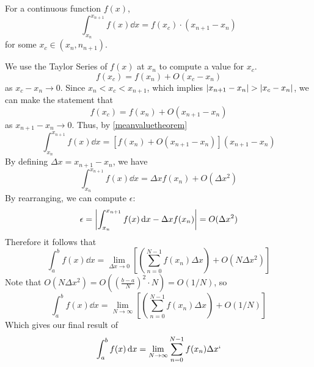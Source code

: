 \documentclass{article}
\begin{document}
\begin{theorem}
	For a continuous function $f(x)$,
	\begin{equation}\label{meanvaluetheorem}
		\int_{x_n}^{x_{n+1}} f(x) \dd{x} = f(x_c) \cdot (x_{n+1} - x_n)
	\end{equation}
	for some $x_c\in (x_n, n_{n+1})$.
\end{theorem}
\noindent We use the Taylor Series of $f(x)$ at $x_n$ to compute a value for $x_c$.
\[ f(x_c) = f(x_n) + O(x_c - x_n) \]
as $x_c - x_n \to 0$. Since $x_n < x_c < x_{n+1}$, which implies $\abs{x_{n+1} - x_n} > \abs{x_c - x_n}$, we can make the statement that
\[ f(x_c) = f(x_n) + O(x_{n+1} - x_n) \]
as $x_{n+1} - x_n \to 0$. Thus, by \eqref{meanvaluetheorem}
\[ \int_{x_n}^{x_{n+1}} f(x) \dd{x} = \left[ f(x_n) + O(x_{n+1} - x_n) \right] (x_{n+1} - x_n) \]
By defining $\Delta x = x_{n+1} - x_n$, we have
\begin{equation}
	\int_{x_n}^{x_{n+1}} f(x) \dd{x} = \Delta x f(x_n) + O(\Delta x ^ 2)
\end{equation}
By rearranging, we can compute $\epsilon$:
\[ \epsilon = \abs{\int_{x_n}^{x_{n+1}} f(x) \dd{x} - \Delta x f(x_n)} = O(\Delta x ^ 2) \]
Therefore it follows that
\[ \int_{a}^{b} f(x) \dd{x} = \lim_{\Delta x \to 0} \left[ \left( \sum_{n=0}^{N-1} f(x_n) \Delta x \right) + O(N\Delta x^2) \right] \]
Note that $O(N\Delta x^2) = O((\frac{b-a}{N})^2 \cdot N) = O(1/N)$, so
\[ \int_{a}^{b} f(x) \dd{x} = \lim_{N \to \infty} \left[ \left( \sum_{n=0}^{N-1} f(x_n) \Delta x \right) + O(1/N) \right] \]
Which gives our final result of
\begin{equation}\label{definiteintegral}
	\int_{a}^{b} f(x) \dd{x} = \lim_{N \to \infty} \sum_{n=0}^{N-1} f(x_n) \Delta x`
\end{equation}
\end{document}
